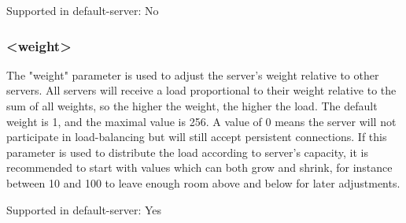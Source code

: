   Supported in default-server: No

\subsubsection[weight]{ <weight>}
  The "weight" parameter is used to adjust the server's weight relative to
  other servers. All servers will receive a load proportional to their weight
  relative to the sum of all weights, so the higher the weight, the higher the
  load. The default weight is 1, and the maximal value is 256. A value of 0
  means the server will not participate in load-balancing but will still accept
  persistent connections. If this parameter is used to distribute the load
  according to server's capacity, it is recommended to start with values which
  can both grow and shrink, for instance between 10 and 100 to leave enough
  room above and below for later adjustments.

  Supported in default-server: Yes
